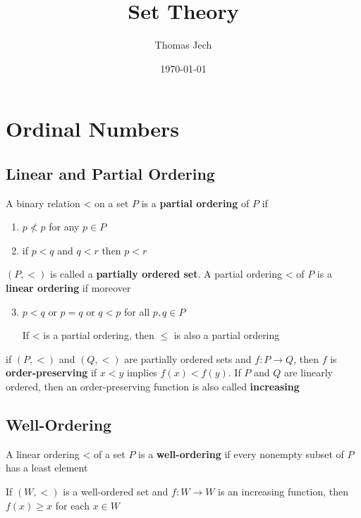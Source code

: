 \documentclass[11pt]{article}
\author{Thomas Jech}
\date{\today}
\title{Set Theory}
\begin{document}
\maketitle
\tableofcontents


\section{Ordinal Numbers}
\label{sec:org21364c4}

\subsection{Linear and Partial Ordering}
\label{sec:org393a1ea}
\begin{definition}[]
A binary relation < on a set \(P\) is a \textbf{partial ordering} of \(P\) if
\begin{enumerate}
\item \(p\not<p\) for any \(p\in P\)
\item if \(p<q\) and \(q<r\) then \(p<r\)
\end{enumerate}


\((P,<)\) is called a \textbf{partially ordered set}. A partial ordering < of \(P\) is a \textbf{linear ordering}
if moreover
\begin{enumerate}
\setcounter{enumi}{2}
\item \(p<q\) or \(p=q\) or \(q<p\) for all \(p,q\in P\)

If < is a partial ordering, then \(\le\) is also a partial ordering
\end{enumerate}
\end{definition}

if \((P,<)\) and \((Q,<)\) are partially ordered sets and \(f:P\to Q\), then \(f\) is
\textbf{order-preserving} if \(x<y\) implies \(f(x)<f(y)\). If \(P\) and \(Q\) are linearly ordered, then
an order-preserving function is also called \textbf{increasing}

\subsection{Well-Ordering}
\label{sec:org55660f4}
\begin{definition}[]
A linear ordering < of a set \(P\) is a \textbf{well-ordering} if every nonempty subset of \(P\) has a
least element
\end{definition}

\begin{lemma}[]
\label{lemma2.4}
If \((W,<)\) is a well-ordered set and \(f:W\to W\) is an increasing function, then \(f(x)\ge x\)
for each \(x\in W\)
\end{lemma}
\end{document}
